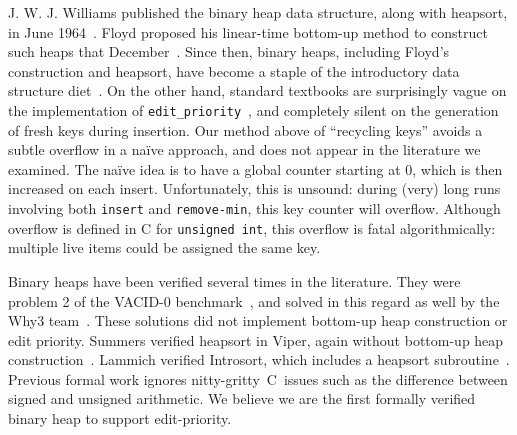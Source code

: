J. W. J. Williams published the binary heap data structure, along with heapsort, in June 1964~\cite{10.1145/512274.512284}.  Floyd proposed his linear-time bottom-up method to construct such heaps that December~\cite{10.1145/355588.365103}.  Since then, binary heaps, including Floyd's construction and heapsort, have become a staple of the introductory data structure diet~\cite{clrs}.  On the other hand, standard textbooks are surprisingly vague on the implementation of \texttt{edit\_priority}~\cite{clrs,sedgewick,DBLP:books/daglib/0015106}, and completely silent on the generation of fresh keys during insertion.  Our method above of ``recycling keys'' avoids a subtle overflow in a na\"ive approach, and does not appear in the literature we examined.  The na\"ive idea is to have a global counter starting at 0, which is then increased on each insert.  Unfortunately, this is unsound: during (very) long runs involving both \texttt{insert} and \texttt{remove-min}, this key counter will overflow.  Although overflow is defined in C for \texttt{unsigned int}, this overflow is fatal algorithmically: multiple live items could be assigned the same key.


Binary heaps have been verified several times in the literature.  They were problem 2 of the VACID-0 benchmark~\cite{Leino10vacid-0:verification}, and solved in this regard as well by the Why3 team~\cite{tafat:binheap}.  These solutions did not implement bottom-up heap construction or edit priority.  Summers verified heapsort in Viper, again without bottom-up heap construction~\cite{Muelleremail}.
Lammich verified Introsort, which includes a heapsort subroutine~\cite{DBLP:conf/cade/Lammich20}.  %
Previous formal work ignores nitty-gritty~C~issues such as the difference between signed and unsigned arithmetic.  We believe we are the first formally verified binary heap to support edit-priority.
